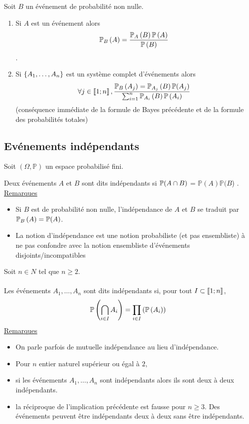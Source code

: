 \begin{defprop}
    Soit \(B\) un événement de probabilité non nulle.
    \begin{enumerate}
        \item Si \(A\) est un événement alors
            \[\probacond{A}{B} = \frac{\probacond{B}{A} \proba{A}}{\proba{B}}\] .
        \item Si \(\accol{A_1, \dots , A_n}\) est un système complet d’événements alors
        \[\forall j \in \interventierii{1}{n} , \frac{\probacond{A_j}{B} = \probacond{B}{A_j}\mathbb{P}(A_j)}{\sum^n_{i=1} \probacond{B}{A_i}\proba{A_i}}\]
        (conséquence immédiate de la formule de Bayes précédente et de la formule des probabilités totales)
    \end{enumerate}
\end{defprop}

\subsection{Evénements indépendants}
Soit \((\Omega, \mathbb{P})\) un espace probabilisé fini.
\begin{defprop}
    Deux événements \(A\) et \(B\) sont dits indépendants si \(\mathbb{P} (A \inter B)\) = \(\mathbb{P} (A) \mathbb{P} (B\)) .\\
    \underline{Remarques}\\
    \begin{itemize}
        \item Si \(B\) est de probabilité non nulle, l’indépendance de \(A\) et \(B\) se traduit par \(\probacond{A}{B}  = \mathbb{P} (A)\).
        \item La notion d’indépendance est une notion probabiliste (et pas ensembliste) à ne pas confondre avec la notion ensembliste d’événements disjoints/incompatibles
    \end{itemize}
\end{defprop}

\begin{defprop}
    Soit \(n \in N\) tel que \(n \geq 2\).\\~\\
    Les événements \(A_1, \dots , A_n\) sont dits indépendants si, pour tout \(I \subset \interventierii{1}{n}\),
    \[\proba{\biginter_{i\in I}A_i}= \prod_{i\in I}\paren{\proba{A_i}}\]
    \underline{Remarques} \\
    \begin{itemize}
        \item On parle parfois de mutuelle indépendance au lieu d’indépendance.
        \item Pour \(n\) entier naturel supérieur ou égal à \(2\),
        \item si les événements \(A_1, \dots , A_n\) sont indépendants alors ils sont deux à deux indépendants.
        \item la réciproque de l’implication précédente est fausse pour \(n \geq 3\). Des événements peuvent être indépendants deux à deux sans être indépendants.
    \end{itemize}
\end{defprop}

